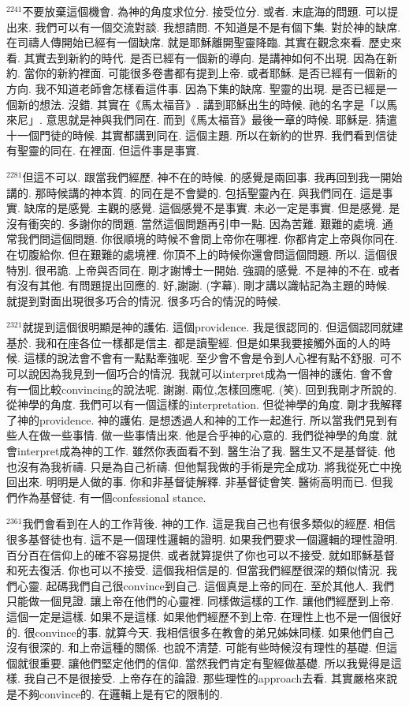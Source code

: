 \documentclass{book}
\begin{document}
$^{2241}$不要放棄這個機會.
為神的角度求位分.
接受位分.
或者.
末底海的問題.
可以提出來.
我們可以有一個交流對談.
我想請問.
不知道是不是有個下集.
對於神的缺席.
在司禱人傳開始已經有一個缺席.
就是耶穌離開聖靈降臨.
其實在觀念來看.
歷史來看.
其實去到新約的時代.
是否已經有一個新的導向.
是講神如何不出現.
因為在新約.
當你的新約裡面.
可能很多卷書都有提到上帝.
或者耶穌.
是否已經有一個新的方向.
我不知道老師會怎樣看這件事.
因為下集的缺席.
聖靈的出現.
是否已經是一個新的想法.
沒錯.
其實在《馬太福音》.
講到耶穌出生的時候.
祂的名字是「以馬來尼」.
意思就是神與我們同在.
而到《馬太福音》最後一章的時候.
耶穌是.
猜遣十一個門徒的時候.
其實都講到同在.
這個主題.
所以在新約的世界.
我們看到信徒有聖靈的同在.
在裡面.
但這件事是事實.

$^{2281}$但這不可以.
跟當我們經歷.
神不在的時候.
的感覺是兩回事.
我再回到我一開始講的.
那時候講的神本質.
的同在是不會變的.
包括聖靈內在.
與我們同在.
這是事實.
缺席的是感覺.
主觀的感覺.
這個感覺不是事實.
未必一定是事實.
但是感覺.
是沒有衝突的.
多謝你的問題.
當然這個問題再引申一點.
因為苦難.
艱難的處境.
通常我們問這個問題.
你很順境的時候不會問上帝你在哪裡.
你都肯定上帝與你同在.
在切腹給你.
但在艱難的處境裡.
你頂不上的時候你還會問這個問題.
所以.
這個很特別.
很弔詭.
上帝與否同在.
剛才謝博士一開始.
強調的感覺.
不是神的不在.
或者有沒有其他.
有問題提出回應的.
好,謝謝.
(字幕).
剛才講以識帖記為主題的時候.
就提到對面出現很多巧合的情況.
很多巧合的情況的時候.

$^{2321}$就提到這個很明顯是神的護佑.
這個providence.
我是很認同的.
但這個認同就建基於.
我和在座各位一樣都是信主.
都是讀聖經.
但是如果我要接觸外面的人的時候.
這樣的說法會不會有一點點牽強呢.
至少會不會是令到人心裡有點不舒服.
可不可以說因為我見到一個巧合的情況.
我就可以interpret成為一個神的護佑.
會不會有一個比較convincing的說法呢.
謝謝.
兩位,怎樣回應呢.
(笑).
回到我剛才所說的.
從神學的角度.
我們可以有一個這樣的interpretation.
但從神學的角度.
剛才我解釋了神的providence.
神的護佑.
是想透過人和神的工作一起進行.
所以當我們見到有些人在做一些事情.
做一些事情出來.
他是合乎神的心意的.
我們從神學的角度.
就會interpret成為神的工作.
雖然你表面看不到.
醫生治了我.
醫生又不是基督徒.
他也沒有為我祈禱.
只是為自己祈禱.
但他幫我做的手術是完全成功.
將我從死亡中挽回出來.
明明是人做的事.
你和非基督徒解釋.
非基督徒會笑.
醫術高明而已.
但我們作為基督徒.
有一個confessional stance.

$^{2361}$我們會看到在人的工作背後.
神的工作.
這是我自己也有很多類似的經歷.
相信很多基督徒也有.
這不是一個理性邏輯的證明.
如果我們要求一個邏輯的理性證明.
百分百在信仰上的確不容易提供.
或者就算提供了你也可以不接受.
就如耶穌基督和死去復活.
你也可以不接受.
這個我相信是的.
但當我們經歷很深的類似情況.
我們心靈.
起碼我們自己很convince到自己.
這個真是上帝的同在.
至於其他人.
我們只能做一個見證.
讓上帝在他們的心靈裡.
同樣做這樣的工作.
讓他們經歷到上帝.
這個一定是這樣.
如果不是這樣.
如果他們經歷不到上帝.
在理性上也不是一個很好的.
很convince的事.
就算今天.
我相信很多在教會的弟兄姊妹同樣.
如果他們自己沒有很深的.
和上帝這種的關係.
也說不清楚.
可能有些時候沒有理性的基礎.
但這個就很重要.
讓他們堅定他們的信仰.
當然我們肯定有聖經做基礎.
所以我覺得是這樣.
我自己不是很接受.
上帝存在的論證.
那些理性的approach去看.
其實嚴格來說是不夠convince的.
在邏輯上是有它的限制的.
\end{document}
